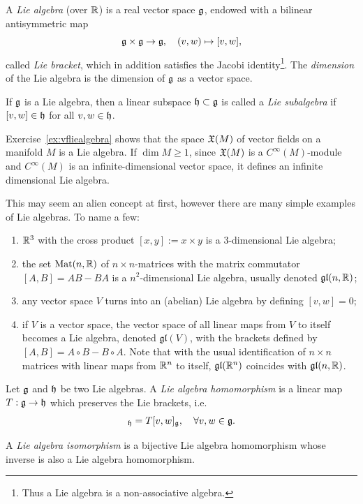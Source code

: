 \begin{definition}\label{def:LieAlgebra}
	A \emph{Lie algebra} (over $\mathbb{R}$) is a real vector space $\mathfrak{g}$, endowed with a bilinear antisymmetric map
	\begin{equation}
		\mathfrak{g} \times \mathfrak{g} \to \mathfrak{g}, \quad (v,w)\mapsto [v,w],
	\end{equation}
	called \emph{Lie bracket}, which in addition satisfies the Jacobi identity\footnote{Thus a Lie algebra is a non-associative algebra.}.
	The \emph{dimension} of the Lie algebra is the dimension of $\mathfrak{g}$ as a vector space.

	If $\mathfrak{g}$ is a Lie algebra, then a linear subspace $\mathfrak{h}\subset\mathfrak{g}$ is called a \emph{Lie subalgebra} if $[v,w]\in\mathfrak{h}$ for all $v,w\in\mathfrak{h}$.
\end{definition}

\begin{example}
	Exercise~\ref{ex:vfliealgebra} shows that the space $\mathfrak{X}(M)$ of vector fields on a manifold $M$ is a Lie algebra.
	If $\dim M\geq 1$, since $\mathfrak{X}(M)$ is a $C^\infty(M)$-module and $C^\infty(M)$ is an infinite-dimensional vector space, it defines an infinite dimensional Lie algebra.

	This may seem an alien concept at first, however there are many simple examples of Lie algebras. To name a few:
	\begin{enumerate}
		\item $\mathbb{R}^3$ with the cross product $[x,y]:=x\times y$ is a $3$-dimensional Lie algebra;
		\item the set $\mathrm{Mat}(n, \mathbb{R})$ of $n\times n$-matrices with the matrix commutator $[A,B] = AB-BA$ is a $n^2$-dimensional Lie algebra, usually denoted $\mathfrak{gl}(n, \mathbb{R})$;
		\item any vector space $V$ turns into an (abelian) Lie algebra by defining $[v,w]=0$;
		\item if $V$ is a vector space, the vector space of all linear maps from $V$ to itself becomes a Lie algebra, denoted $\mathfrak{gl}(V)$, with the brackets defined by $[A,B] = A\circ B-B\circ A$. Note that with the usual identification of $n\times n$ matrices with linear maps from $\mathbb{R}^n$ to itself, $\mathfrak{gl}(\mathbb{R}^n)$ coincides with $\mathfrak{gl}(n, \mathbb{R})$.
	\end{enumerate}
\end{example}

\begin{definition}\label{def:LAmorphism}
	Let $\mathfrak{g}$ and $\mathfrak{h}$ be two Lie algebras.
	A \emph{Lie algebra homomorphism} is a linear map $T:\mathfrak{g}\to\mathfrak{h}$ which preserves the Lie brackets, i.e.
	\begin{equation}
		[Tv, Tw]_\fh = T[v,w]_\fg, \quad \forall v,w\in\fg.
	\end{equation}

	A \emph{Lie algebra isomorphism} is a bijective Lie algebra homomorphism whose inverse is also a Lie algebra homomorphism.
\end{definition}

